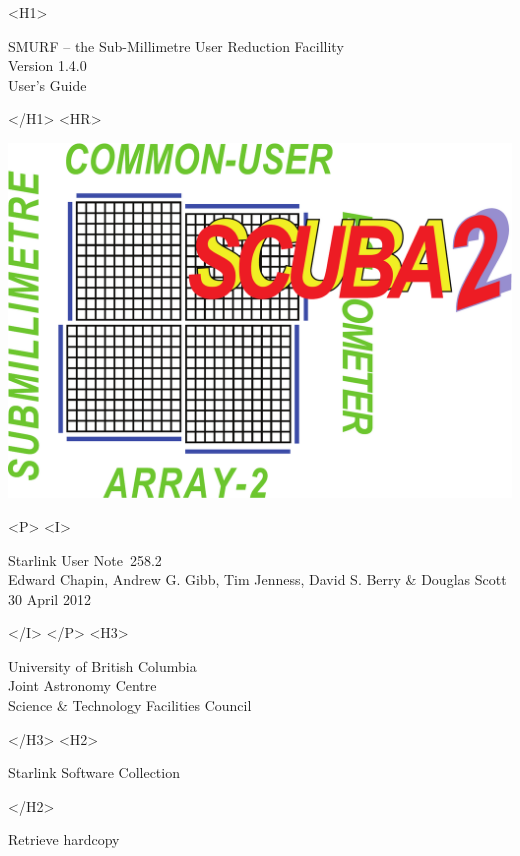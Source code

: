 \documentclass[twoside,11pt]{article}
\newcommand{\stardoccategory}  {Starlink User Note}
\newcommand{\stardocsource}    {sun\stardocnumber}
\newcommand{\stardocnumber}    {258.2}
\newcommand{\stardocauthors}   {Edward Chapin, Andrew G. Gibb, Tim Jenness, David S. Berry  \& Douglas Scott}
\newcommand{\stardocdate}      {30 April 2012}
\newcommand{\stardoctitle}     {SMURF -- the Sub-Millimetre User Reduction Facillity}
\newcommand{\stardocversion}   {Version 1.4.0}
\newcommand{\stardocmanual}    {User's Guide}
\newcommand{\htmladdnormallink}[2]{#1}
\newcommand{\htmladdimg}[1]{}
\newcommand{\xlabel}[1]{}
\renewcommand{\_}{\texttt{\symbol{95}}}
\begin{document}
\begin{htmlonly}
   \xlabel{}
   \begin{rawhtml} <H1> \end{rawhtml}
      \stardoctitle\\
      \stardocversion\\
      \stardocmanual
   \begin{rawhtml} </H1> <HR> \end{rawhtml}

\includegraphics[scale=0.7]{sun258_logo}

   \begin{rawhtml} <P> <I> \end{rawhtml}
   \stardoccategory\ \stardocnumber \\
   \stardocauthors \\
   \stardocdate
   \begin{rawhtml} </I> </P> <H3> \end{rawhtml}
      \htmladdnormallink{University of British Columbia}
                        {http://www.ubc.ca} \\
      \htmladdnormallink{Joint Astronomy Centre}
                        {http://www.jach.hawaii.edu}\\
      \htmladdnormallink{Science \& Technology Facilities Council}
                        {http://www.stfc.ac.uk} \\
   \begin{rawhtml} </H3> <H2> \end{rawhtml}
      \htmladdnormallink{Starlink Software Collection}{http://starlink.jach.hawaii.edu/}
   \begin{rawhtml} </H2> \end{rawhtml}
   \htmladdnormallink{\htmladdimg{source.gif} Retrieve hardcopy}
      {http://starlink.jach.hawaii.edu/cgi-bin/hcserver?\stardocsource}\\


\end{htmlonly}
\end{document}

